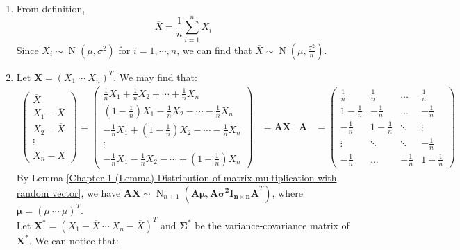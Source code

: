 \documentclass{huhtakm-template-book-v2}
\DeclareMathOperator{\N}{N}
\begin{document}
\begin{proofing}
	\begin{enumerate}
		\item From definition,
		\begin{equation*}
			\overline{X}=\frac{1}{n}\sum_{i=1}^{n}X_{i}
		\end{equation*}
		Since $X_{i}\sim\N(\mu,\sigma^{2})$ for $i=1,\cdots,n$, we can find that $\overline{X}\sim\N(\mu,\frac{\sigma^{2}}{n})$.
		\item Let $\mathbf{X}=(X_{1}\ \cdots\ X_{n})^{T}$. We may find that:
		\begin{align*}
			\begin{pmatrix}
				\overline{X}\\ X_{1}-\overline{X}\\ X_{2}-\overline{X}\\ \vdots\\ X_{n}-\overline{X}
			\end{pmatrix}=\begin{pmatrix}
				\frac{1}{n}X_{1}+\frac{1}{n}X_{2}+\cdots+\frac{1}{n}X_{n}\\
				\left(1-\frac{1}{n}\right)X_{1}-\frac{1}{n}X_{2}-\cdots-\frac{1}{n}X_{n}\\
				-\frac{1}{n}X_{1}+\left(1-\frac{1}{n}\right)X_{2}-\cdots-\frac{1}{n}X_{n}\\
				\vdots\\
				-\frac{1}{n}X_{1}-\frac{1}{n}X_{2}-\cdots+\left(1-\frac{1}{n}\right)X_{n}
			\end{pmatrix}&=\mathbf{AX} & \mathbf{A}&=\begin{pmatrix}
				\frac{1}{n} & \frac{1}{n} & \hdots & \frac{1}{n}\\
				1-\frac{1}{n} & -\frac{1}{n} & \hdots & -\frac{1}{n}\\
				-\frac{1}{n} & 1-\frac{1}{n} & \ddots & \vdots\\
				\vdots & \ddots & \ddots & -\frac{1}{n}\\
				-\frac{1}{n} & \hdots & -\frac{1}{n} & 1-\frac{1}{n}
			\end{pmatrix}
		\end{align*}
		By Lemma \ref{Chapter 1 (Lemma) Distribution of matrix multiplication with random vector}, we have $\mathbf{AX}\sim\N_{n+1}(\mathbf{A}\boldsymbol{\mu},\mathbf{A\sigma^{2}I_{n\times n}A}^{T})$, where $\boldsymbol{\mu}=(\mu\ \cdots\ \mu)^{T}$.\\
		Let $\mathbf{X^{*}}=(X_{1}-\overline{X}\ \cdots\ X_{n}-\overline{X})^{T}$ and $\mathbf{\Sigma^{*}}$ be the variance-covariance matrix of $\mathbf{X}^{*}$. We can notice that:

\end{enumerate}
\end{proofing}
\end{document}
